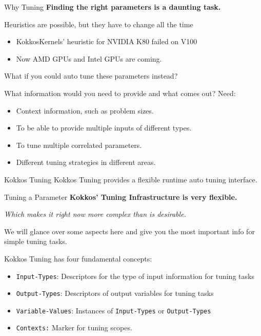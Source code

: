 
\begin{frame}[fragile]{Why Tuning}
\textbf{Finding the right parameters is a daunting task.}

Heuristics are possible, but they have to change all the time
\begin{itemize}
  \item KokkosKernels' heuristic for NVIDIA K80 failed on V100
  \item Now AMD GPUs and Intel GPUs are coming. 
\end{itemize}

\pause
\vspace{10pt}
What if you could auto tune these parameters instead?

\vspace{5pt}
What information would you need to provide and what comes out? Need:

\pause
\vspace{5pt}
\begin{itemize}
  \item Context information, such as problem sizes.
  \item To be able to provide multiple inputs of different types.
  \item To tune multiple correlated parameters.
  \item Different tuning strategies in different areas.
\end{itemize}

\pause
\begin{block}{Kokkos Tuning}
Kokkos Tuning provides a flexible runtime auto tuning interface.
\end{block}
\end{frame}


\begin{frame}[fragile]{Tuning a Parameter}
\textbf{Kokkos' Tuning Infrastructure is very flexible.}

\pause
\vspace{5pt}
\textit{Which makes it right now more complex than is desirable.}

We will glance over some aspects here and give you the most important info for simple tuning tasks.

\pause
\vspace{10pt}
Kokkos Tuning has four fundamental concepts:
\begin{itemize}
  \item \texttt{Input-Types}: Descriptors for the type of input information for tuning tasks
  \item \texttt{Output-Types}: Descriptors of output variables for tuning tasks
  \item \texttt{Variable-Values}: Instances of \texttt{Input-Types} or \texttt{Output-Types}
  \item \texttt{Contexts:} Marker for tuning scopes. 
\end{itemize}
\end{frame}

